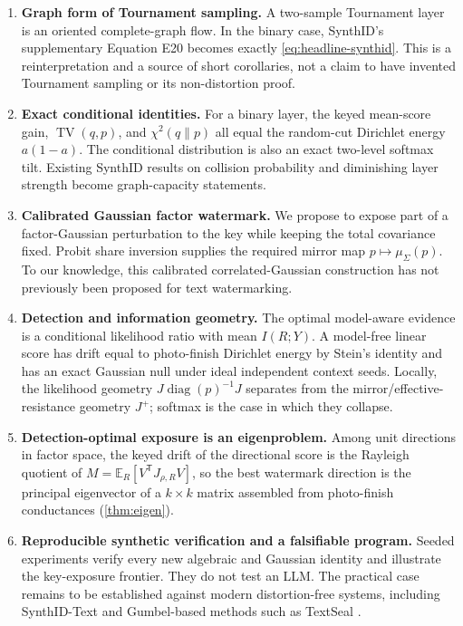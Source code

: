 \documentclass[11pt]{article}
\theoremstyle{definition}
\theoremstyle{remark}
\DeclareMathOperator{\diag}{diag}
\DeclareMathOperator{\TV}{TV}
\newcommand{\E}{\mathbb{E}}
\newcommand{\trans}{\mathsf{T}}
\begin{document}
\begin{enumerate}
\item \textbf{Graph form of Tournament sampling.} A two-sample Tournament layer is an oriented complete-graph flow. In the binary case, SynthID's supplementary Equation E20 becomes exactly \eqref{eq:headline-synthid}. This is a reinterpretation and a source of short corollaries, not a claim to have invented Tournament sampling or its non-distortion proof.

\item \textbf{Exact conditional identities.} For a binary layer, the keyed mean-score gain, $\TV(q,p)$, and $\chi^2(q\|p)$ all equal the random-cut Dirichlet energy $a(1-a)$. The conditional distribution is also an exact two-level softmax tilt. Existing SynthID results on collision probability and diminishing layer strength become graph-capacity statements.

\item \textbf{Calibrated Gaussian factor watermark.} We propose to expose part of a factor-Gaussian perturbation to the key while keeping the total covariance fixed. Probit share inversion supplies the required mirror map $p\mapsto\mu_\Sigma(p)$. To our knowledge, this calibrated correlated-Gaussian construction has not previously been proposed for text watermarking.

\item \textbf{Detection and information geometry.} The optimal model-aware evidence is a conditional likelihood ratio with mean $I(R;Y)$. A model-free linear score has drift equal to photo-finish Dirichlet energy by Stein's identity and has an exact Gaussian null under ideal independent context seeds. Locally, the likelihood geometry $J\diag(p)^{-1}J$ separates from the mirror/effective-resistance geometry $J^+$; softmax is the case in which they collapse.

\item \textbf{Detection-optimal exposure is an eigenproblem.} Among
unit directions in factor space, the keyed drift of the directional
score is the Rayleigh quotient of $M=\E_R[V^\trans J_{\rho,R}V]$, so
the best watermark direction is the principal eigenvector of a
$k\times k$ matrix assembled from photo-finish conductances
(\cref{thm:eigen}).

\item \textbf{Reproducible synthetic verification and a falsifiable program.} Seeded experiments verify every new algebraic and Gaussian identity and illustrate the key-exposure frontier. They do not test an LLM. The practical case remains to be established against modern distortion-free systems, including SynthID-Text and Gumbel-based methods such as TextSeal \citep{sander2026textseal}.
\end{enumerate}
\end{document}
